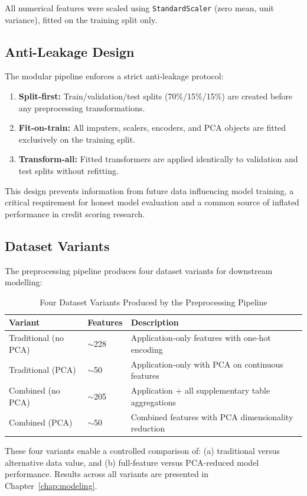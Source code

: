 All numerical features were scaled using \texttt{StandardScaler} (zero mean, unit variance), fitted on the training split only.

\subsection{Anti-Leakage Design}

The modular pipeline enforces a strict anti-leakage protocol:
\begin{enumerate}
    \item \textbf{Split-first:} Train/validation/test splits (70\%/15\%/15\%) are created before any preprocessing transformations.
    \item \textbf{Fit-on-train:} All imputers, scalers, encoders, and PCA objects are fitted exclusively on the training split.
    \item \textbf{Transform-all:} Fitted transformers are applied identically to validation and test splits without refitting.
\end{enumerate}

This design prevents information from future data influencing model training, a critical requirement for honest model evaluation and a common source of inflated performance in credit scoring research.

\subsection{Dataset Variants}

The preprocessing pipeline produces four dataset variants for downstream modelling:

\begin{table}[H]
\centering
\caption{Four Dataset Variants Produced by the Preprocessing Pipeline}
\label{tab:dataset_variants}
\begin{tabular}{llp{7cm}}
\toprule
\textbf{Variant} & \textbf{Features} & \textbf{Description} \\
\midrule
Traditional (no PCA) & $\sim$228 & Application-only features with one-hot encoding \\
Traditional (PCA) & $\sim$50 & Application-only with PCA on continuous features \\
Combined (no PCA) & $\sim$205 & Application + all supplementary table aggregations \\
Combined (PCA) & $\sim$50 & Combined features with PCA dimensionality reduction \\
\bottomrule
\end{tabular}
\end{table}

These four variants enable a controlled comparison of: (a) traditional versus alternative data value, and (b) full-feature versus PCA-reduced model performance. Results across all variants are presented in Chapter~\ref{chap:modeling}.
